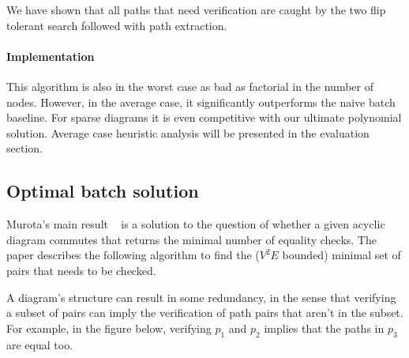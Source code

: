 \documentclass[sigplan,review,anonymous]{acmart}
\begin{document}
We have shown that all paths that need verification are caught by the two flip tolerant search followed with path extraction.

\paragraph{Implementation}

This algorithm is also in the worst case as bad as factorial in the number of nodes. However, in the average case, it significantly outperforms the naive batch baseline. For sparse diagrams it is even competitive with our ultimate polynomial solution. Average case heuristic analysis will be presented in the evaluation section.

\subsection{Optimal batch solution}
Murota's main result ~\cite{commutative} is a solution to the question of whether a given acyclic diagram commutes that returns the minimal number of equality checks. The paper describes the following algorithm to find the ($V^2E$ bounded) minimal set of pairs that needs to be checked.

A diagram's structure can result in some redundancy, in the sense that verifying a subset of pairs can imply the verification of path pairs that aren't in the subset.
For example, in the figure below, verifying $p_1$ and $p_2$ implies that the paths in $p_3$ are equal too.
\end{document}
